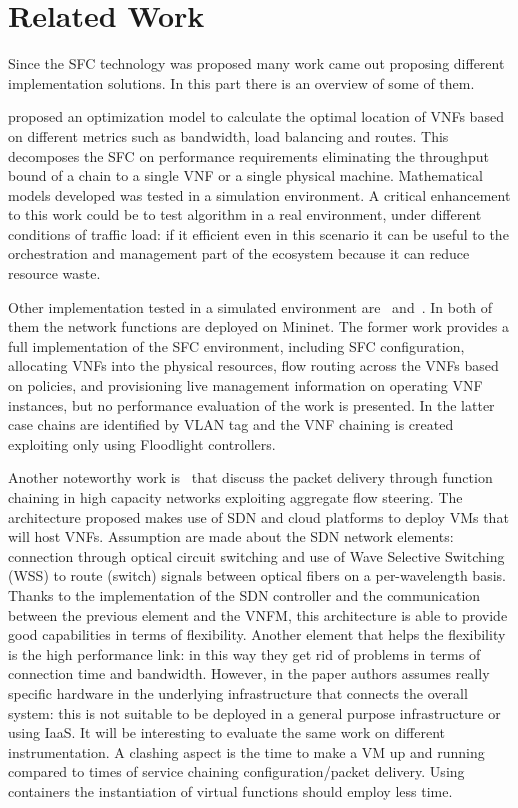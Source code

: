 \chapter{Related Work}
\label{chap:rel_wk}

Since the SFC technology was proposed many work came out proposing different
implementation solutions. In this part there is an overview of some of them.

\cite{GhaznaviSAB16} proposed an optimization model to calculate the optimal
location of VNFs based on different metrics such as bandwidth, load balancing
and routes. This decomposes the SFC on performance requirements eliminating the
throughput bound of a chain to a single VNF or a single physical machine.
Mathematical models developed was tested in a simulation environment. A critical
enhancement to this work could be to test algorithm in a real environment, under
different conditions of traffic load: if it efficient even in this scenario it
can be useful to the orchestration and management part of the ecosystem because
it can reduce resource waste.

Other implementation tested in a simulated environment
are~\cite{csoma2014escape} and~\cite{kim2016evaluations}. In both of them the
network functions are deployed on Mininet. The former work provides a full
implementation of the SFC environment, including SFC configuration, allocating
VNFs into the physical resources, flow routing across the VNFs based on
policies, and provisioning live management information on operating VNF
instances, but no performance evaluation of the work is presented. In the latter
case chains are identified by VLAN tag and the VNF chaining is created
exploiting only using Floodlight controllers.

Another noteworthy work is~\cite{xia2015optical} that discuss the packet
delivery through function chaining in high capacity networks exploiting
aggregate flow steering. The architecture proposed makes use of SDN and cloud
platforms to deploy VMs that will host VNFs. Assumption are made about the SDN
network elements: connection through optical circuit switching and use of Wave
Selective Switching (WSS) to route (switch) signals between optical fibers on a
per-wavelength basis. Thanks to the implementation of the SDN controller and the
communication between the previous element and the VNFM, this architecture is
able to provide good capabilities in terms of flexibility. Another element that
helps the flexibility is the high performance link: in this way they get rid of
problems in terms of connection time and bandwidth. However, in the paper
authors assumes really specific hardware in the underlying infrastructure that
connects the overall system: this is not suitable to be deployed in a general
purpose infrastructure or using IaaS. It will be interesting to evaluate the
same work on different instrumentation. A clashing aspect is the time to make a
VM up and running compared to times of service chaining configuration/packet
delivery. Using containers the instantiation of virtual functions should employ
less time.

